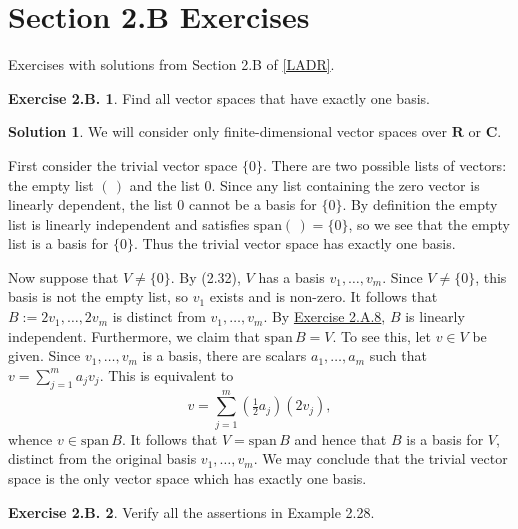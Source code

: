 \documentclass[12pt]{article}
\theoremstyle{definition}
\theoremstyle{exercise}
\newtheorem{exercise}{Exercise 2.B.}
\theoremstyle{solution}
\newtheorem*{solution}{Solution}
\newcommand{\Span}{\text{span}}
\newcommand{\R}{\mathbf{R}}
\newcommand{\C}{\mathbf{C}}
\begin{document}
\section{Section 2.B Exercises}

Exercises with solutions from Section 2.B of \hyperlink{ladr}{[LADR]}.

\begin{exercise}
\label{ex:1}
    Find all vector spaces that have exactly one basis.
\end{exercise}

\begin{solution}
    We will consider only finite-dimensional vector spaces over \( \R \) or \( \C \).

    First consider the trivial vector space \( \{ 0 \} \). There are two possible lists of vectors: the empty list \( (\,) \) and the list \( 0 \). Since any list containing the zero vector is linearly dependent, the list \( 0 \) cannot be a basis for \( \{ 0 \} \). By definition the empty list is linearly independent and satisfies \( \Span (\,) = \{ 0 \} \), so we see that the empty list is a basis for \( \{ 0 \} \). Thus the trivial vector space has exactly one basis.

    Now suppose that \( V \neq \{ 0 \} \). By (2.32), \( V \) has a basis \( v_1, \ldots, v_m \). Since \( V \neq \{ 0 \} \), this basis is not the empty list, so \( v_1 \) exists and is non-zero. It follows that \( B := 2 v_1, \ldots, 2 v_m \) is distinct from \( v_1, \ldots, v_m \). By \href{https://lew98.github.io/Mathematics/LADR_Section_2_A_Exercises.pdf}{Exercise 2.A.8}, \( B \) is linearly independent. Furthermore, we claim that \( \Span\,B = V \). To see this, let \( v \in V \) be given. Since \( v_1, \ldots, v_m \) is a basis, there are scalars \( a_1, \ldots, a_m \) such that \( v = \sum_{j=1}^m a_j v_j \). This is equivalent to
    \[
        v = \sum_{j=1}^m \left( \tfrac{1}{2} a_j \right) (2 v_j),
    \]
    whence \( v \in \Span\,B \). It follows that \( V = \Span\,B \) and hence that \( B \) is a basis for \( V \), distinct from the original basis \( v_1, \ldots, v_m \). We may conclude that the trivial vector space is the only vector space which has exactly one basis.
\end{solution}

\begin{exercise}
\label{ex:2}
    Verify all the assertions in Example 2.28.
\end{exercise}
\end{document}
